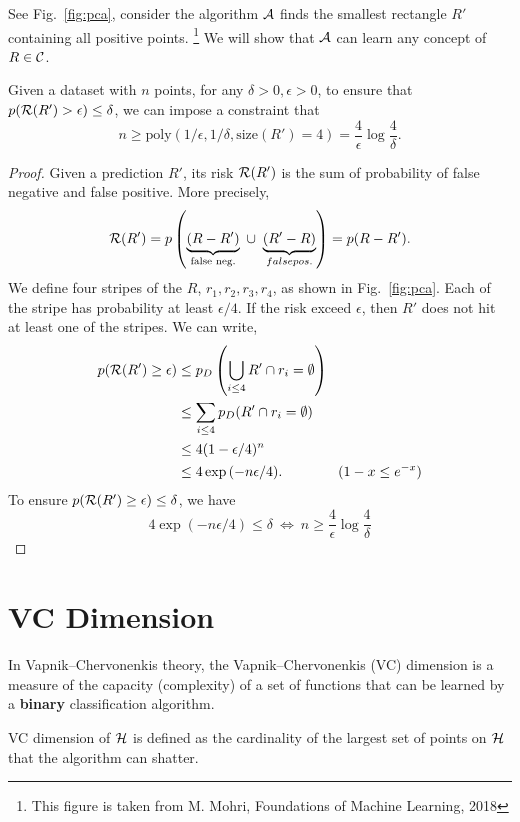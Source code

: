 See Fig.~\ref{fig:pca}, consider the algorithm $\mathcal{A}$ finds the smallest rectangle $R'$ containing all positive points. \footnote{This figure is taken from M. Mohri, Foundations of Machine Learning, 2018} We will show that $\mathcal{A}$ can learn any concept of $R \in \mathcal{C}$.
\begin{theorem} Given a dataset with $n$ points, for any $\delta > 0, \epsilon > 0$, to ensure that $p(\mathcal{R}(R') > \epsilon) \leq \delta$, we can impose a constraint that
$$
 n \geq \mathrm{poly}(1/\epsilon, 1/\delta, \mathrm{size}(R')=4) = \frac{4}{\epsilon} \log \frac{4}{\delta}.
$$
\end{theorem}
\begin{proof}
	Given a prediction $R'$, its risk $\mathcal{R}(R')$ is the sum of probability of false negative and false positive. More precisely,
	\begin{equation}
		\mathcal{R}(R') = p\left( \underbrace{(R - R')}_{\text{false neg.}}\ \cup\ \underbrace{(R' - R)}_{false pos.} \right) = p(R - R').
	\end{equation}
	We define four stripes of the $R$, $r_1, r_2, r_3, r_4$, as shown in Fig.~\ref{fig:pca}. Each of the stripe has probability at least $\epsilon / 4$. If the risk exceed $\epsilon$, then $R'$ does not hit at least one of the stripes. We can write,
	\begin{align}
		p(\mathcal{R}(R') \geq \epsilon) & \leq p_D\left(\bigcup_{i \leq 4} R' \cap r_i = \emptyset\right) \\
		& \leq \sum_{i \leq 4} p_D(R' \cap r_i = \emptyset) \\
		& \leq 4 (1 - \epsilon / 4)^n \\
		& \leq 4 \exp{(-n \epsilon / 4 )}. \qquad\qquad  (1 - x \leq e^{-x})
	\end{align}
To ensure $p(\mathcal{R}(R') \geq \epsilon) \leq \delta$, we have
\begin{equation}
	4 \exp{(-n \epsilon / 4 )} \leq \delta \ \Longleftrightarrow \ n \geq \frac{4}{\epsilon} \log \frac{4}{\delta}
\end{equation}
\end{proof}             

\section{VC Dimension}
In Vapnik–Chervonenkis theory, the Vapnik–Chervonenkis (VC) dimension is a measure of the capacity (complexity) of a set of functions that can be learned by a \textbf{binary} classification algorithm. 
\begin{definition}
	VC dimension of $\mathcal{H}$ is defined as the cardinality of the largest set of points on $\mathcal{H}$ that the algorithm can shatter.
\end{definition}

